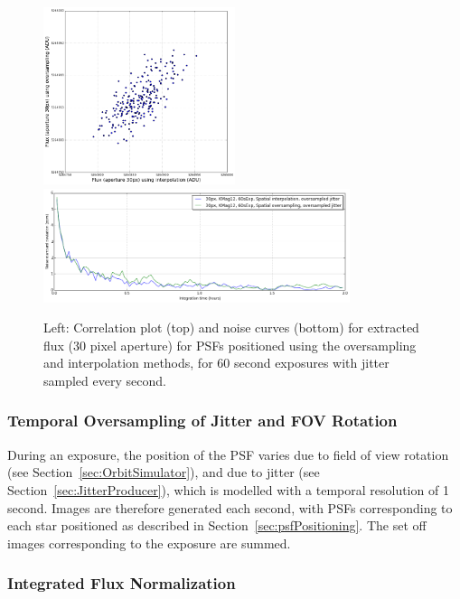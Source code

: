 \documentclass[11pt]{article}      %
\begin{document}
\begin{figure}[hbtp]
  \begin{center}
    \includegraphics[width=0.5\textwidth]{psf_interp_correlation.png}\\
    \includegraphics[width=0.8\textwidth]{psf_interp_noise.png}
    \caption{Left: Correlation plot (top) and noise curves (bottom) for extracted flux (30 pixel aperture) for PSFs positioned using the oversampling and interpolation methods, for 60 second exposures with jitter sampled every second.}
    \label{fig:interp2}
  \end{center}
\end{figure}

\subsubsection{Temporal Oversampling of Jitter and FOV Rotation}

During an exposure, the position of the PSF varies due to field of view rotation (see Section~\ref{sec:OrbitSimulator}), and due to jitter (see Section~\ref{sec:JitterProducer}), which is modelled with a temporal resolution of 1 second. Images are therefore generated each second, with PSFs corresponding to each star positioned as described in Section~\ref{sec:psfPositioning}. The set off images corresponding to the exposure are summed.

\subsubsection{Integrated Flux Normalization}
\end{document}
